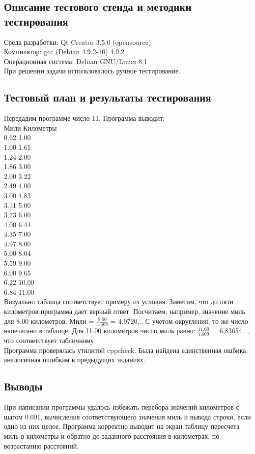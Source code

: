 \documentclass[12pt,a4paper]{report}
\begin{document}
\subsection{Описание тестового стенда и методики тестирования}
Среда разработки: Qt Creator 3.5.0 (opensource)\\
Компилятор: gcc (Debian 4.9.2-10) 4.9.2 \\
Операционная система: Debian GNU/Linux 8.1 \\
При решении задачи использовалось ручное тестирование. 
\subsection{Тестовый план и результаты тестирования}
Передадим программе число 11. Программа выводит: \\
Мили Километры\\
0.62 1.00 \\
1.00 1.61 \\
1.24 2.00 \\
1.86 3.00 \\
2.00 3.22 \\
2.49 4.00 \\
3.00 4.83 \\
3.11 5.00 \\
3.73 6.00 \\
4.00 6.44 \\
4.35 7.00 \\
4.97 8.00 \\
5.00 8.04 \\
5.59 9.00 \\
6.00 9.65 \\
6.22 10.00 \\
6.84 11.00 \\
Визуально таблица соответствует примеру из условия. Заметим, что до пяти километров программа дает верный ответ. Посчитаем, например, значение миль для 8.00 километров. Мили = $\frac{8.00}{1.609}$ = 4.9720... С учетом округления, то же число напечатано в таблице. Для 11.00 километров число миль равно: $\frac{11.00}{1.609}$ = 6,83654..., что соответствует табличному. \\
Программа проверялась утилитой cppcheck. Была найдена единственная ошбика, аналогичная ошибкам в предыдущих заданиях.
\subsection{Выводы}
При написании программы удалось избежать перебора значений километров с шагом 0.001, вычисления соответствующего значения миль и вывода строки, если одно из них целое. Программа корректно выводит на экран таблицу пересчета миль в километры и обратно до заданного расстояния в километрах, по возрастанию расстояний.
\end{document}
